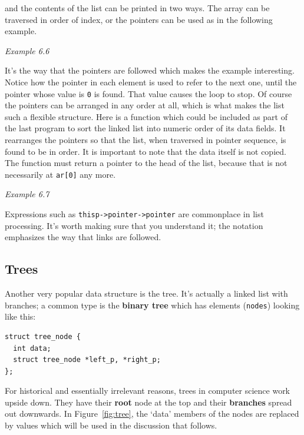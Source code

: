    and the contents of the list can be printed in two ways. The array can be
    traversed in order of index, or the pointers can be used as in the
    following example.


    \begin{center}\textit{Example 6.6}\end{center}


   It's the way that the pointers are followed which makes the example
    interesting. Notice how the pointer in each element is used to refer to the
    next one, until the pointer whose value is \texttt{0} is found. That
    value causes the \while{} loop to stop. Of course the pointers
    can be arranged in any order at all, which is what makes the list such
    a flexible structure. Here is a function which could be included as part of
    the last program to sort the linked list into numeric order of its data
    fields. It rearranges the pointers so that the list, when traversed in
    pointer sequence, is found to be in order. It is important to note that the
    data itself is not copied. The function must return a pointer to the head
    of the list, because that is not necessarily at \texttt{ar[0]} any
    more.


    \begin{center}\textit{Example 6.7}\end{center}


   Expressions such as \texttt{thisp->pointer->pointer} are
    commonplace in list processing. It's worth making sure that you understand
    it; the notation emphasizes the way that links are followed.


  

  \subsection{Trees}
   

   Another very popular data structure is the tree. It's actually a linked
    list with branches; a common type is the \textbf{binary tree} which has
    elements (\texttt{nodes}) looking like this:


   \begin{Verbatim}
struct tree_node {
  int data;
  struct tree_node *left_p, *right_p;
};
\end{Verbatim}

   For historical and essentially irrelevant reasons, trees in computer
    science work upside down. They have their \textbf{root} node at the top
    and their \textbf{branches} spread out downwards.
    In Figure~\ref{fig:tree},
    the `data' members of the nodes are replaced by values
    which will be used in the discussion that follows.


